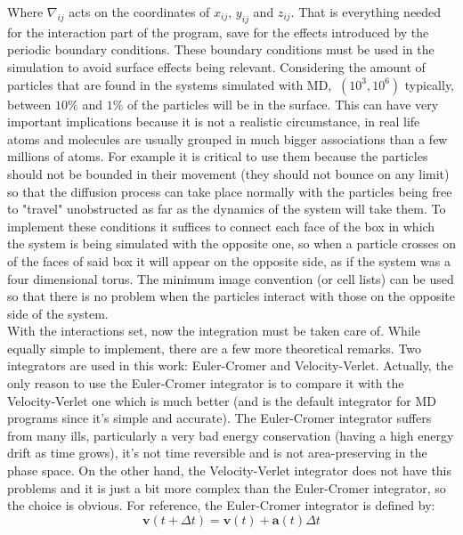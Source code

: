 \documentclass[11pt,a4paper,oneside]{article}
\begin{document}
		Where $\nabla_{ij}$ acts on the coordinates of $x_{ij}$, $y_{ij}$ and $z_{ij}$. That is everything needed for the interaction part of the program, save for the effects introduced by the periodic boundary conditions. These boundary conditions must be used in the simulation to avoid surface effects being relevant. Considering the amount of particles that are found in the systems simulated with MD, $~\left(10^3,10^6\right)$ typically, between $10\%$ and $1\%$ of the particles will be in the surface. This can have very important implications because it is not a realistic circumstance, in real life atoms and molecules are usually grouped in much bigger associations than a few millions of atoms. For example it is critical to use them because the particles should not be bounded in their movement (they should not bounce on any limit) so that the diffusion process can take place normally with the particles being free to "travel" unobstructed as far as the dynamics of the system will take them. To implement these conditions it suffices to connect each face of the box in which the system is being simulated with the opposite one, so when a particle crosses on of the faces of said box it will appear on the opposite side, as if the system was a four dimensional torus. The minimum image convention (or cell lists) can be used so that there is no problem when the particles interact with those on the opposite side of the system.\\
		
		With the interactions set, now the integration must be taken care of. While equally simple to implement, there are a few more theoretical remarks. Two integrators are used in this work: Euler-Cromer and Velocity-Verlet. Actually, the only reason to use the Euler-Cromer integrator is to compare it with the Velocity-Verlet one which is much better (and is the default integrator for MD programs since it's simple and accurate). The Euler-Cromer integrator suffers from many ills, particularly a very bad energy conservation (having a high energy drift as time grows), it's not time reversible and is not area-preserving in the phase space. On the other hand, the Velocity-Verlet integrator does not have this problems and it is just a bit more complex than the Euler-Cromer integrator, so the choice is obvious. For reference, the Euler-Cromer integrator is defined by:\\
		
		\begin{equation*}\mathbf{v}\left(t+\Delta t\right)=\mathbf{v}\left(t\right)+\mathbf{a}\left(t\right)\Delta t\end{equation*}
		
\end{document}
